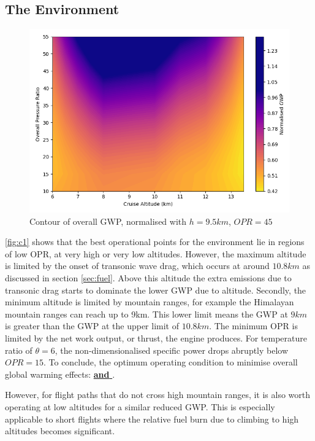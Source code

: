 \documentclass[12pt, a4paper]{article}
\begin{document}
\subsection{The Environment} \label{sec:c1}
\begin{figure}
	\centering
	\includegraphics[width=\textwidth]{../Plots/contour ovr}
	\caption{Contour of overall GWP, normalised with $h=9.5km$, $OPR=45$}
	\label{fig:c1}
\end{figure}
\autoref{fig:c1} shows that the best operational points for the environment lie in regions of low OPR, at very high or very low altitudes. However, the maximum altitude is limited by the onset of transonic wave drag, which occurs at around $10.8km$ as discussed in section \ref{sec:fuel}. Above this altitude the extra emissions due to transonic drag starts to dominate the lower GWP due to altitude. Secondly, the minimum altitude is limited by mountain ranges, for example the Himalayan mountain ranges can reach up to 9km. This lower limit means the GWP at $9km$ is greater than the GWP at the upper limit of $10.8km$. The minimum OPR is limited by the net work output, or thrust, the engine produces. For temperature ratio of $\theta=6$, the non-dimensionalised specific power drops abruptly below $OPR=15$. To conclude, the optimum operating condition to minimise overall global warming effects: \underline{ \textbf{and}  }. 

However, for flight paths that do not cross high mountain ranges, it is also worth operating at low altitudes for a similar reduced GWP. This is especially applicable to short flights where the relative fuel burn due to climbing to high altitudes becomes significant.
\end{document}
